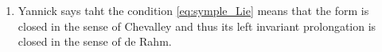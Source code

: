 
\begin{enumerate}
    \item
        Yannick says taht the condition \eqref{eq:symple_Lie} means that the form is closed in the sense of Chevalley and thus its left invariant prolongation is closed in the sense of de Rahm.
\end{enumerate}
